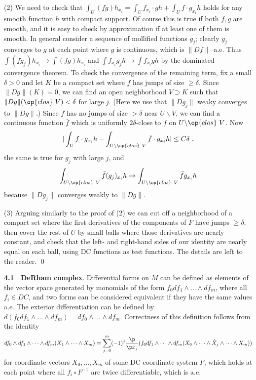 (2) We need to check that $\int_U (fg)h_{x_i}=\int_U f_{x_i}\cdot gh+
\int_U f\cdot g_{x_i}h$ holds for any smooth function $h$ with compact support.
Of course this is true if both $f,g$ are smooth, and it is easy to check by
approximation if at least one of them is smooth. In general consider a
sequence of
mollified functions $g_j$; clearly $g_j$ converges to $g$ at each point
where $g$ is
continuous, which is $\|Df\|$--a.e. Thus $\int (fg_j)h_{x_i}\to\int
(fg)h_{x_i}$ and $\int f_{x_i}g_j h\to\int f_{x_i}gh$ by the dominated
convergence
theorem. To check the convergence of the remaining term, fix a small
$\delta > 0$
and let $K$ be a compact set where $f$ has jumps of size $\geq\delta$.
Since $\|Dg\|(K)=0$, we can find an open neighborhood $V\supset K$
such that
$\|Dg\|({\op{clos}} \ V) < \delta$ for large $j$. (Here we use that $\|Dg_j\|$
weaky converges to $\|Dg\|$.) Since $f$ has no jumps of size $>\delta$ near
$U\backslash
V$, we can find a continuous function $\bar f$ which is uniformly $2\delta$-close to
$f$ on
$U\backslash{\op{clos}} \  V$. Now
$$
|\int_U f\cdot g_{x_i}h-\int_{U\backslash{\op{clos}} \  V} \bar f\cdot
g_{x_i}h| \leq C\delta \ ,
$$
the same is true for $g_j$ with large $j$, and
$$
\int_{U\backslash{\op{clos}} \  V} \bar f(g_j)_{x_i}h\to
\int_{U\backslash{\op{clos}} \  V} \bar f g_{x_i}h
$$
because $\|Dg_j\|$ converges weakly to $\|Dg\|$.

(3) Arguing similarly to the proof of (2) we can cut off a neighborhood of
a compact
set where the first derivatives of the components of $F$ have jumps $\geq
\delta$,
then cover the rest of $U$ by small balls where those derivatives are nearly
constant, and check that the left- and right-hand sides of our identity are
nearly
equal on each ball,  using DC functions as test functions. The details are
left to
the reader.   \qed

\bigskip
{\bf 4.1 \ DeRham complex}. Differential forms on $M$ can be defined as
elements of
the vector space generated by monomials of the form $f_0 df_1\wedge\dots\wedge
df_m$, where all $f_i\in DC$, and two forms can be considered equivalent if they
have the same values a.e. The exterior differentiation can be defined by
$d(f_0df_1\wedge\dots\wedge df_m)= df_0\wedge\dots\wedge df_m$. Correctness
of this
definition follows from the identity
$$
df_0\wedge df_1\wedge\dots\wedge df_m(X_1\wedge\dots\wedge X_m)=
\sum^m_{j=0} (-1)^j \frac{\p}{\p x_j}(
f_0 df_1\wedge\dots\wedge df_m(X_0\wedge\dots\wedge \hat
X_j\wedge\dots\wedge X_m))
$$
for coordinate vectors $X_0,\dots ,X_m$ of some DC coordinate system $F$,
which holds at each point where all $f_i\circ F^{-1}$ are twice differentiable,
which is a.e.

